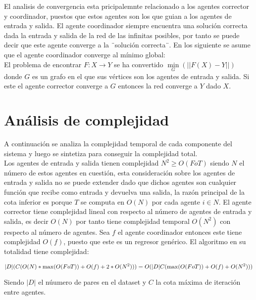     El analisis de convergencia esta pricipalemnte relacionado a los agentes corrector y coordinador, puestos que estos agentes son los que guian a los agentes 
    de entrada y salida. El agente coordinador siempre encuentra una solución correcta dada la entrada y salida de la red de las infinitas posibles, por tanto se 
    puede decir que este agente converge a la ¨solución correcta¨. En los siguiente se asume que el agente coordinador converge al mínimo global: \\

    El problema de encontrar $F:X \rightarrow Y$ se ha convertido $\underset{G}{\min}(||F(X)-Y||)$ donde $G$ es un grafo en el que sus vértices son los agentes de entrada y salida. Si 
    este el agente corrector converge a $G$  entonces la red converge a $Y$ dado $X$.


 \section*{Análisis de complejidad}

    A continuación se analiza la complejidad temporal de cada componente del sistema y luego se sintetiza para conseguir la complejidad total. \\

    Los agentes de entrada y salida tienen complejidad $N^2 \geq O(FoT) $ siendo $N$ el número de estos agentes en cuestión, esta consideración 
    sobre los agentes de entrada y salida no se puede extender dado que dichos agentes son cualquier función que recibe como entrada y devuelva una salida, la 
    razón principal de la cota inferior es porque $T$ se computa en $O(N)$ por cada agente $i \in N$. El agente corrector tiene complejidad lineal con respecto al número de agentes 
    de entrada y salida, es decir $O(N)$ por tanto tiene complejidad temporal $O(N^2)$ con respecto al número de agentes. Sea $f$ el agente coordinador entonces este tiene complejidad $O(f)$, puesto que este es un regresor genérico. 
    El algoritmo en su totalidad tiene complejidad: 
    \begin{center}
        
        \begin{equation*}
                
                |D|(C( O(N) * \max(O(F o T )) + O(f) + 2 * O(N^2) )) \\
                = O(|D|C( \max(O(F o T )) + O(f) + O(N^2)))\\

        \end{equation*}

    \end{center}

Siendo $|D|$ el núumero de pares en el dataset y $C$ la cota máxima de iteración entre agentes.